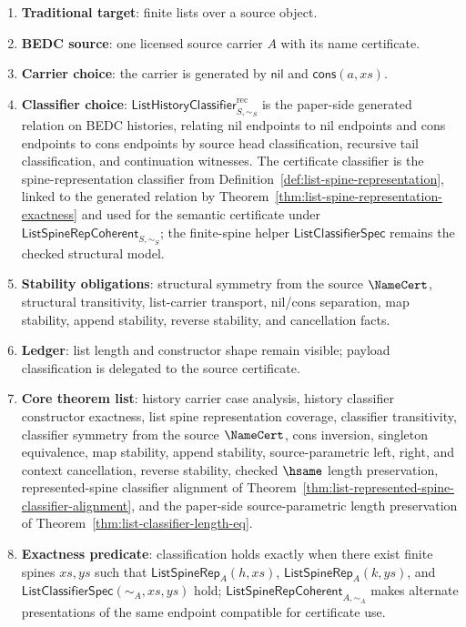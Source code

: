\begin{enumerate}
  \item \textbf{Traditional target}: finite lists over a source object.
  \item \textbf{BEDC source}: one licensed source carrier $A$ with its name certificate.
  \item \textbf{Carrier choice}: the carrier is generated by $\mathsf{nil}$ and $\mathsf{cons}(a,xs)$.
  \item \textbf{Classifier choice}: $\mathsf{ListHistoryClassifier}^{\mathrm{rec}}_{S,\sim_S}$ is the paper-side generated relation on BEDC histories, relating nil endpoints to nil endpoints and cons endpoints to cons endpoints by source head classification, recursive tail classification, and continuation witnesses. The certificate classifier is the spine-representation classifier from Definition~\ref{def:list-spine-representation}, linked to the generated relation by Theorem~\ref{thm:list-spine-representation-exactness} and used for the semantic certificate under $\mathsf{ListSpineRepCoherent}_{S,\sim_S}$; the finite-spine helper $\mathsf{ListClassifierSpec}$ remains the checked structural model.
  \item \textbf{Stability obligations}: structural symmetry from the source $\NameCert$, structural transitivity, list-carrier transport, nil/cons separation, map stability, append stability, reverse stability, and cancellation facts.
  \item \textbf{Ledger}: list length and constructor shape remain visible; payload classification is delegated to the source certificate.
  \item \textbf{Core theorem list}: history carrier case analysis, history classifier constructor exactness, list spine representation coverage, classifier transitivity, classifier symmetry from the source $\NameCert$, cons inversion, singleton equivalence, map stability, append stability, source-parametric left, right, and context cancellation, reverse stability, checked $\hsame$ length preservation, represented-spine classifier alignment of Theorem~\ref{thm:list-represented-spine-classifier-alignment}, and the paper-side source-parametric length preservation of Theorem~\ref{thm:list-classifier-length-eq}.
  \item \textbf{Exactness predicate}: classification holds exactly when there exist finite spines $xs,ys$ such that $\mathsf{ListSpineRep}_A(h,xs)$, $\mathsf{ListSpineRep}_A(k,ys)$, and $\mathsf{ListClassifierSpec}(\sim_A,xs,ys)$ hold; $\mathsf{ListSpineRepCoherent}_{A,\sim_A}$ makes alternate presentations of the same endpoint compatible for certificate use.

\end{enumerate}
